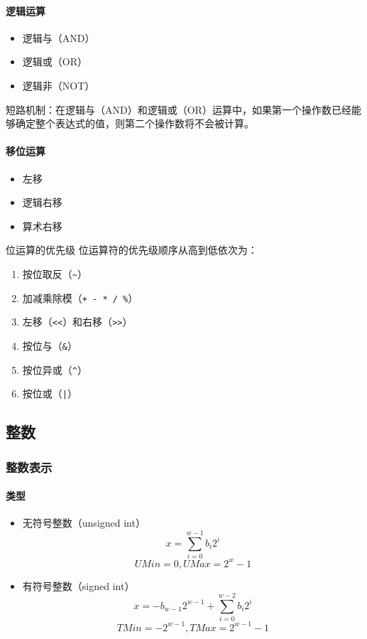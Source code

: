 \paragraph{逻辑运算}
\begin{itemize}
    \item 逻辑与（AND）
    \item 逻辑或（OR）
    \item 逻辑非（NOT）
\end{itemize}

短路机制：在逻辑与（AND）和逻辑或（OR）运算中，如果第一个操作数已经能够确定整个表达式的值，则第二个操作数将不会被计算。

\paragraph{移位运算}
\begin{itemize}
    \item 左移
    \item 逻辑右移
    \item 算术右移
\end{itemize}

\begin{sidenote}{位运算的优先级}
    位运算符的优先级顺序从高到低依次为：
    \begin{enumerate}
        \item 按位取反（\verb|~|）
        \item 加减乘除模（\verb|+ - * / %|）
        \item 左移（\verb|<<|）和右移（\verb|>>|）
        \item 按位与（\verb|&|）
        \item 按位异或（\verb|^|）
        \item 按位或（\verb!|!）
    \end{enumerate}
\end{sidenote}

\subsection{整数}
\subsubsection{整数表示}
\paragraph{类型}
\begin{itemize}
    \item 无符号整数（unsigned int）
          $$x = \sum_{i=0}^{w-1} b_i 2^i$$
          $$UMin = 0, UMax = 2^w - 1$$
    \item 有符号整数（signed int）
          $$x = -b_{w-1} 2^{w-1} + \sum_{i=0}^{w-2} b_i 2^i$$
          $$TMin = -2^{w-1}, TMax = 2^{w-1} - 1$$
\end{itemize}

